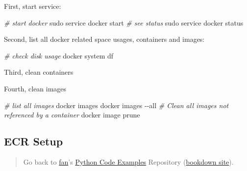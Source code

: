 \documentclass[
]{book}
\newenvironment{Shaded}{\begin{snugshade}}{\end{snugshade}}
\newcommand{\CommentTok}[1]{\textcolor[rgb]{0.56,0.35,0.01}{\textit{#1}}}
\newcommand{\ExtensionTok}[1]{#1}
\newcommand{\FunctionTok}[1]{\textcolor[rgb]{0.00,0.00,0.00}{#1}}
\newcommand{\NormalTok}[1]{#1}
\newcommand{\VariableTok}[1]{\textcolor[rgb]{0.00,0.00,0.00}{#1}}
\begin{document}
First, start service:

\begin{Shaded}
\begin{Highlighting}[]
\CommentTok{\# start docker}
\FunctionTok{sudo}\NormalTok{ service docker start}
\CommentTok{\# see status}
\FunctionTok{sudo}\NormalTok{ service docker status}
\end{Highlighting}
\end{Shaded}

Second, list all docker related space usages, containers and images:

\begin{Shaded}
\begin{Highlighting}[]
\CommentTok{\# check disk usage}
\ExtensionTok{docker}\NormalTok{ system df}
\end{Highlighting}
\end{Shaded}

Third, clean containers

\begin{Shaded}
\end{Shaded}

Fourth, clean images

\begin{Shaded}
\begin{Highlighting}[]
\CommentTok{\# list all images}
\ExtensionTok{docker}\NormalTok{ images}
\ExtensionTok{docker}\NormalTok{ images {-}{-}all}
\CommentTok{\# Clean all images not referenced by a container}
\ExtensionTok{docker}\NormalTok{ image prune}
\end{Highlighting}
\end{Shaded}

\hypertarget{ecr-setup}{%
\subsection{ECR Setup}\label{ecr-setup}}

\begin{quote}
Go back to \href{http://fanwangecon.github.io/}{fan}'s \href{https://fanwangecon.github.io/pyfan/}{Python Code Examples} Repository (\href{https://fanwangecon.github.io/pyfan/bookdown}{bookdown site}).
\end{quote}
\end{document}
